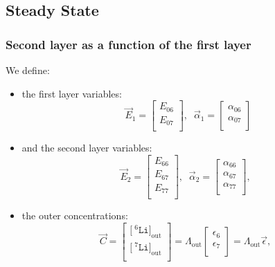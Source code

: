 \documentclass[aps,onecolumn,11pt]{revtex4}
\newcommand{\mychem}[1]{\mathtt{#1}}
\newcommand{\myconc}[1]{\big[#1\big]}
\newcommand{\spLi}[1]{{\!~^{#1}\mychem{Li}}}
\newcommand{\Li}[1]{\myconc{\spLi{#1}}}
\newcommand{\myout}[1]{{#1}_{\mathrm{out}}}
\newcommand{\LiOut}[1]{\myout{\Li{#1}}}
\newcommand{\LiAll}{\Lambda}
\newcommand{\LiAllOut}{\myout{\LiAll}}
\begin{document}
\subsection{Steady State}


\subsubsection{Second layer as a function of the first layer}

We define:
\begin{itemize}
\item the first layer variables:
\begin{equation}
	\vec{E}_1 = \begin{bmatrix}
	E_{06}\\
	E_{07}\\
	\end{bmatrix}, \;\; 
	\vec{\alpha}_{1} = 
	\begin{bmatrix}
	\alpha_{06}\\
	\alpha_{07}\\
	\end{bmatrix}
\end{equation}
\item and the second layer variables:
\begin{equation}
	\vec{E}_2 = \begin{bmatrix}
	E_{66}\\
	E_{67}\\
	E_{77}\\
	\end{bmatrix},\;\;
	\vec{\alpha}_2 = \begin{bmatrix}
	\alpha_{66}\\
	\alpha_{67}\\
	\alpha_{77}\\
	\end{bmatrix},\;\;
\end{equation}
\item the outer concentrations:
\begin{equation}
\label{eq:C}
	\vec{C} = 
	\begin{bmatrix}
	\LiOut{6}\\
	\LiOut{7}\\
	\end{bmatrix}
	=
	\LiAllOut
	\begin{bmatrix}
	\epsilon_6\\
	\epsilon_7\\
	\end{bmatrix}
	=
	\LiAllOut\vec{\epsilon},\;\;

\end{equation}
\end{itemize}
\end{document}
